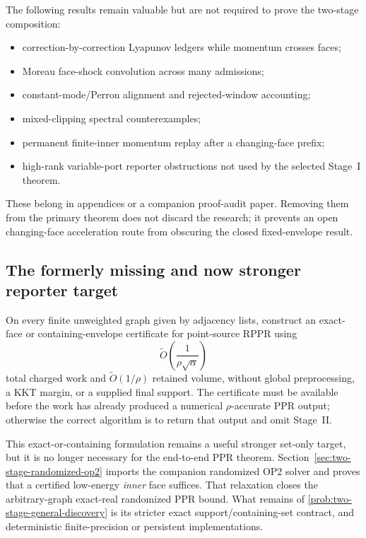 The following results remain valuable but are not required to prove the
two-stage composition:
\begin{itemize}[leftmargin=2.2em]
\item correction-by-correction Lyapunov ledgers while momentum crosses faces;
\item Moreau face-shock convolution across many admissions;
\item constant-mode/Perron alignment and rejected-window accounting;
\item mixed-clipping spectral counterexamples;
\item permanent finite-inner momentum replay after a changing-face prefix;
\item high-rank variable-port reporter obstructions not used by the selected
  Stage~I theorem.
\end{itemize}
These belong in appendices or a companion proof-audit paper.  Removing them
from the primary theorem does not discard the research; it prevents an open
changing-face acceleration route from obscuring the closed fixed-envelope
result.

\subsection{The formerly missing and now stronger reporter target}

\begin{problem}
\label{prob:two-stage-general-discovery}
On every finite unweighted graph given by adjacency lists, construct an
exact-face or containing-envelope certificate for point-source RPPR using
\begin{equation}
 \widetilde O\!\left(\frac1{\rho\sqrt\alpha}\right)
 \label{eq:two-stage-general-discovery-target}
\end{equation}
total charged work and $\widetilde O(1/\rho)$ retained volume, without global
preprocessing, a KKT margin, or a supplied final support.  The certificate
must be available before the work has already produced a numerical
$\rho$-accurate PPR output; otherwise the correct algorithm is to return that
output and omit Stage~II.
\end{problem}

This exact-or-containing formulation remains a useful stronger set-only
target, but it is no longer necessary for the end-to-end PPR theorem.
Section~\ref{sec:two-stage-randomized-op2} imports the companion randomized
OP2 solver and proves that a certified low-energy \emph{inner} face suffices.
That relaxation closes the arbitrary-graph exact-real randomized PPR bound.
What remains of \cref{prob:two-stage-general-discovery} is its stricter exact
support/containing-set contract, and deterministic finite-precision or
persistent implementations.


